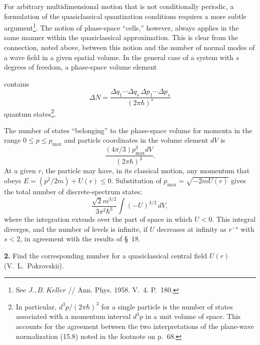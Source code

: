 

For arbitrary multidimensional motion that is not conditionally periodic, a
formulation of the quasiclassical quantization conditions requires a more
subtle argument\footnote{See $J.,B.~Keller$ // Ann. Phys. 1958. V.~4.
P.~180.}. The notion of phase-space ``cells,'' however, always applies in the
same manner within the quasiclassical approximation. This is clear from the
connection, noted above, between this notion and the number of normal modes of
a wave field in a given spatial volume. In the general case of a system with
$s$ degrees of freedom, a phase-space volume element

contains
\begin{equation}
  \Delta N=\frac{\Delta q_1\cdots\Delta q_s\,
  \Delta p_1\cdots\Delta p_s}{(2\pi\hbar)^s}
  \tag{48.7}
\end{equation}
quantum states\footnote{In particular, $d^3p/(2\pi\hbar)^3$ for a single
particle is the number of states associated with a momentum interval $d^3p$
in a unit volume of space. This accounts for the agreement between the two
interpretations of the plane-wave normalization (15.8) noted in the footnote
on p.~68.}.

\ProblemHeading



\SolutionHeading The number of states ``belonging'' to the phase-space volume
for momenta in the range $0\leq p\leq p_{\max}$ and particle coordinates in
the volume element $dV$ is
\[
  \frac{(4\pi/3)p_{\max}^3dV}{(2\pi\hbar)^3}.
\]
At a given $r$, the particle may have, in its classical motion, any momentum
that obeys $E=(p^2/2m)+U(r)\leq0$. Substitution of
$p_{\max}=\sqrt{-2mU(r)}$ gives the total number of discrete-spectrum states:
\[
  \frac{\sqrt2m^{3/2}}{3\pi^2\hbar^3}\int(-U)^{3/2}\,dV,
\]
where the integration extends over the part of space in which $U<0$. This
integral diverges, and the number of levels is infinite, if $U$ decreases at
infinity as $r^{-s}$ with $s<2$, in agreement with the results of §~18.

\textbf{2.} Find the corresponding number for a quasiclassical central field
$U(r)$ (V.~L.~Pokrovskii).


